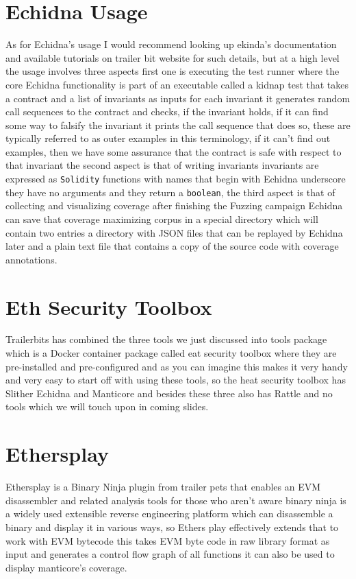 \section{Echidna Usage}

As for Echidna's usage I would recommend looking up ekinda's documentation and available tutorials on trailer bit website for such details, but at a high level the usage involves three aspects first one is executing the test runner where the core Echidna functionality is part of an executable called a kidnap test that takes a contract and a list of invariants as inputs for each invariant it generates random call sequences to the contract and checks, if the invariant holds, if it can find some way to falsify the invariant it prints the call sequence that does so, these are typically referred to as outer examples in this terminology, if it can't find out examples, then we have some assurance that the contract is safe with respect to that invariant the second aspect is that of writing invariants invariants are expressed as \verb|Solidity| functions with names that begin with Echidna underscore they have no arguments and they return a \verb|boolean|, the third aspect is that of collecting and visualizing coverage after finishing the Fuzzing campaign Echidna can save that coverage maximizing corpus in a special directory which will contain two entries a directory with JSON files that can be replayed by Echidna later and a plain text file that contains a copy of the source code with coverage annotations.

\section{Eth Security Toolbox}

Trailerbits has combined the three tools we just discussed into tools package which is a Docker container package called eat security toolbox where they are pre-installed and pre-configured and as you can imagine this makes it very handy and very easy to start off with using these tools, so the heat security toolbox has Slither Echidna and Manticore and besides these three also has Rattle and no tools which we will touch upon in coming slides.

\section{Ethersplay}

Ethersplay is a Binary Ninja plugin from trailer pets that enables an EVM disassembler and related analysis tools for those who aren't aware binary ninja is a widely used extensible reverse engineering platform which can disassemble a binary and display it in various ways, so Ethers play effectively extends that to work with EVM bytecode this takes EVM byte code in raw library format as input and generates a control flow graph of all functions it can also be used to display manticore's coverage.

